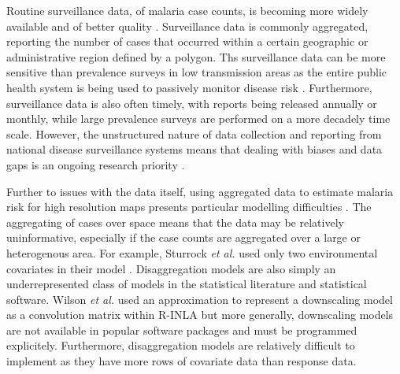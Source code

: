 \documentclass[10pt,letterpaper]{article}
\begin{document}
Routine surveillance data, of malaria case counts, is becoming more widely available and of better quality \cite{sturrock2016mapping, ohrt2015information, cibulskis2011worldwide}.
Surveillance data is commonly aggregated, reporting the number of cases that occurred within a certain geographic or administrative region defined by a polygon.
Ths surveillance data can be more sensitive than prevalence surveys in low transmission areas as the entire public health system is being used to passively monitor disease risk \cite{cibulskis2011worldwide}.
Furthermore, surveillance data is also often timely, with reports being released annually or monthly, while large prevalence surveys are performed on a more decadely time scale.
However, the unstructured nature of data collection and reporting from national disease surveillance systems means that dealing with biases and data gaps is an ongoing research priority \cite{battle2016treatment, cibulskis2011worldwide}.


Further to issues with the data itself, using aggregated data to estimate malaria risk for high resolution maps presents particular modelling difficulties \cite{sturrock2014fine, wilson2017pointless, law2018variational, taylor2017continuous, li2012log}.
The aggregating of cases over space means that the data may be relatively uninformative, especially if the case counts are aggregated over a large or heterogenous area.
For example, Sturrock \emph{et al.} used only two environmental covariates in their model \cite{sturrock2014fine}.
Disaggregation models are also simply an underrepresented class of models in the statistical literature and statistical software.
Wilson \emph{et al.} \cite{wilson2017pointless} used an approximation to represent a downscaling model as a convolution matrix within R-INLA \cite{INLA} but more generally, downscaling models are not available in popular software packages and must be programmed explicitely.
Furthermore, disaggregation models are relatively difficult to implement as they have more rows of covariate data than response data.
\end{document}
